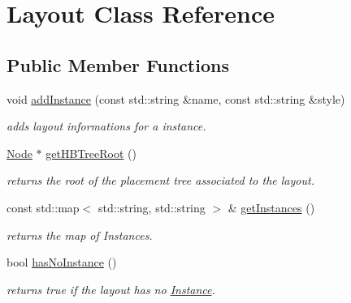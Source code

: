 \hypertarget{class_open_chams_1_1_layout}{}\section{Layout Class Reference}
\label{class_open_chams_1_1_layout}
\subsection*{Public Member Functions}
\begin{DoxyCompactItemize}
\item 
void \mbox{\hyperlink{class_open_chams_1_1_layout_a4cc1899e9b782de44700fa0e4ac477ef}{add\+Instance}} (const std\+::string \&name, const std\+::string \&style)
\begin{DoxyCompactList}\small\item\em adds layout informations for a instance. \end{DoxyCompactList}\item 
\mbox{\label{class_open_chams_1_1_layout_a13df4992219ef28a7dc014e9f5f0566a}} 
\mbox{\hyperlink{class_open_chams_1_1_node}{Node}} $\ast$ \mbox{\hyperlink{class_open_chams_1_1_layout_a13df4992219ef28a7dc014e9f5f0566a}{get\+H\+B\+Tree\+Root}} ()
\begin{DoxyCompactList}\small\item\em returns the root of the placement tree associated to the layout. \end{DoxyCompactList}\item 
\mbox{\label{class_open_chams_1_1_layout_ab0550a9050b7e788b2a18452c9df21f7}} 
const std\+::map$<$ std\+::string, std\+::string $>$ \& \mbox{\hyperlink{class_open_chams_1_1_layout_ab0550a9050b7e788b2a18452c9df21f7}{get\+Instances}} ()
\begin{DoxyCompactList}\small\item\em returns the map of Instances. \end{DoxyCompactList}\item 
\mbox{\label{class_open_chams_1_1_layout_af27a31f10fcf22daa64f35c9c6bd2cda}} 
bool \mbox{\hyperlink{class_open_chams_1_1_layout_af27a31f10fcf22daa64f35c9c6bd2cda}{has\+No\+Instance}} ()
\begin{DoxyCompactList}\small\item\em returns true if the layout has no \mbox{\hyperlink{class_open_chams_1_1_instance}{Instance}}. \end{DoxyCompactList}\item 

\end{DoxyCompactItemize}
